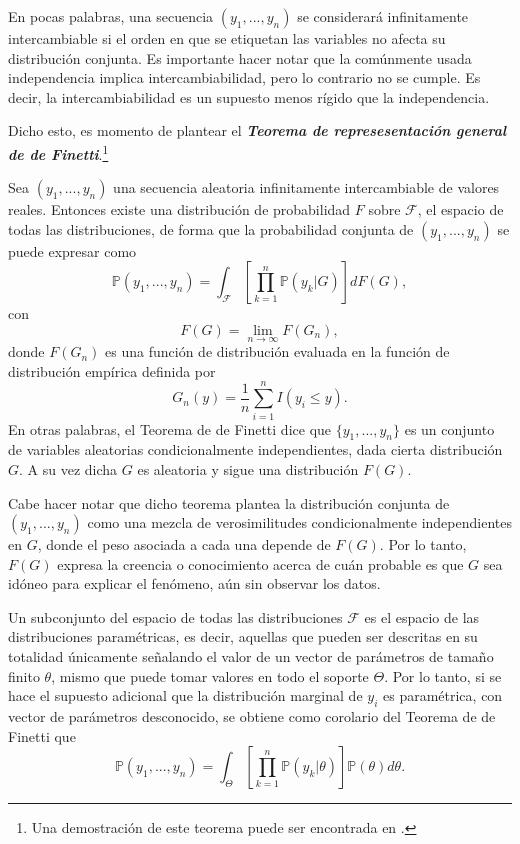 En pocas palabras, una secuencia $(y_1,...,y_n)$ se considerar\'a infinitamente intercambiable si el orden en que se etiquetan las variables no afecta su distribuci\'on conjunta. Es importante hacer notar que la com\'unmente usada independencia implica intercambiabilidad, pero lo contrario no se cumple. Es decir, la intercambiabilidad es un supuesto menos r\'igido que la independencia.

Dicho esto, es momento de plantear el \textbf{\textit{Teorema de represesentaci\'on general de de Finetti}}.\footnote{Una demostraci\'on de este teorema puede ser encontrada en \cite{Schervish_TheoryStats}.}

\begin{theorem*}
    Sea $(y_1, ...,y_n)$ una secuencia aleatoria infinitamente intercambiable de valores reales. Entonces existe una distribuci\'on de probabilidad $F$ sobre $\mathcal{F}$, el espacio de todas las distribuciones, de forma que la probabilidad conjunta de $(y_1, ...,y_n)$ se puede expresar como
    \begin{equation*}
        \mathbb{P}(y_1, ...,y_n) =
        \int_{\mathcal{F}}\left[\prod_{k=1}^n \mathbb{P}(y_k|G)\right]dF(G),
    \end{equation*}
    con
    \begin{equation*}
        F(G) = \lim_{n \to \infty} F(G_n),
    \end{equation*}
    donde $F(G_n)$ es una funci\'on de distribuci\'on evaluada en la funci\'on de distribuci\'on emp\'irica definida por
    \begin{equation*}
        G_n(y) = \frac{1}{n} \sum_{i=1}^n I(y_i \leq y).
    \end{equation*}
    En otras palabras, el Teorema de de Finetti dice que $\{y_1, ...,y_n\}$ es un conjunto de variables aleatorias condicionalmente independientes, dada cierta distribuci\'on $G$. A su vez dicha $G$ es aleatoria y sigue una distribuci\'on $F(G)$.
\end{theorem*}

Cabe hacer notar que dicho teorema plantea la distribuci\'on conjunta de $(y_1, ...,y_n)$ como una mezcla de verosimilitudes condicionalmente independientes en $G$, donde el peso asociada a cada una depende de $F(G)$. Por lo tanto, $F(G)$ expresa la creencia o conocimiento acerca de cu\'an probable es que $G$ sea id\'oneo para explicar el fen\'omeno, a\'un sin observar los datos.

Un subconjunto del espacio de todas las distribuciones $\mathcal{F}$ es el espacio de las distribuciones param\'etricas, es decir, aquellas que pueden ser descritas en su totalidad \'unicamente señalando el valor de un vector de par\'ametros de tamaño finito $\theta$, mismo que puede tomar valores en todo el soporte $\Theta$. Por lo tanto, si se hace el supuesto adicional que la distribuci\'on marginal de $y_i$ es param\'etrica, con vector de par\'ametros desconocido, se obtiene como corolario del Teorema de de Finetti que
\begin{equation*}
    \mathbb{P}(y_1, ...,y_n) =
    \int_{\Theta}\left[\prod_{k=1}^n \mathbb{P}(y_k|\theta)\right]\mathbb{P}(\theta)d\theta.
\end{equation*}

